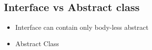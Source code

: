 



\subsection{Interface vs Abstract class}
\begin{itemize}
    \item Interface can contain only body-less abstract 
    \item Abstract Class
\end{itemize}
